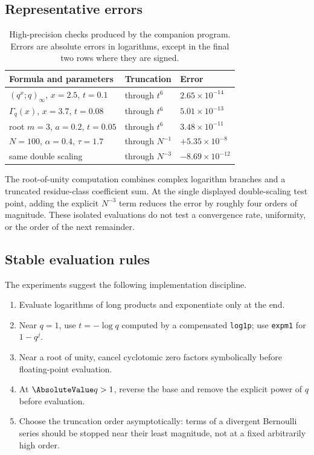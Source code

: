 \documentclass[11pt,oneside]{article}
\theoremstyle{definition}
\theoremstyle{remark}
\let\reportsubsection\subsection
\let\section\reportsubsection
\begin{document}
\section{Representative errors}

\begin{table}[htbp]
\centering
\caption{High-precision checks produced by the companion program.  Errors are
absolute errors in logarithms, except in the final two rows where they are
signed.}
\label{tab:numerical-errors}
\begin{tabular}{@{}lll@{}}
\toprule
Formula and parameters & Truncation & Error\\
\midrule
$(q^x;q)_\infty$, $x=2.5$, $t=0.1$ & through $t^6$ & $2.65\times10^{-14}$\\
$\Gamma_q(x)$, $x=3.7$, $t=0.08$ & through $t^6$ & $5.01\times10^{-13}$\\
root $m=3$, $a=0.2$, $t=0.05$ & through $t^6$ & $3.48\times10^{-11}$\\
$N=100$, $\alpha=0.4$, $\tau=1.7$ & through $N^{-1}$ & $+5.35\times10^{-8}$\\
 same double scaling & through $N^{-3}$ & $-8.69\times10^{-12}$\\
\bottomrule
\end{tabular}
\end{table}

The root-of-unity computation combines complex logarithm branches and a
truncated residue-class coefficient sum.  At the single displayed
double-scaling test point, adding the explicit $N^{-3}$ term reduces the error
by roughly four orders of magnitude.  These isolated evaluations do not test a
convergence rate, uniformity, or the order of the next remainder.

\section{Stable evaluation rules}

The experiments suggest the following implementation discipline.

\begin{enumerate}[label=\arabic*.]
\item Evaluate logarithms of long products and exponentiate only at the end.
\item Near $q=1$, use $t=-\log q$ computed by a compensated
      \texttt{log1p}; use \texttt{expm1} for $1-q^j$.
\item Near a root of unity, cancel cyclotomic zero factors symbolically before
      floating-point evaluation.
\item At $\AbsoluteValue q>1$, reverse the base and remove the explicit power of $q$
      before evaluation.
\item Choose the truncation order asymptotically: terms of a divergent
      Bernoulli series should be stopped near their least magnitude, not at a
      fixed arbitrarily high order.
\end{enumerate}
\end{document}
